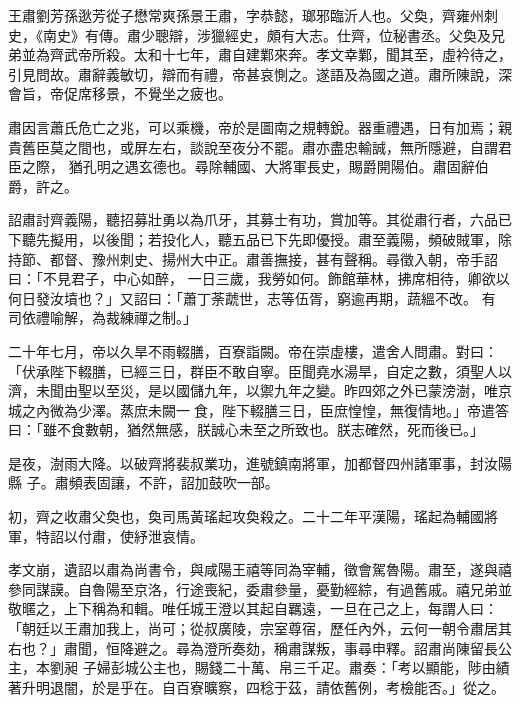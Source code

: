 
\begin{pinyinscope}

 王肅劉芳孫逖芳從子懋常爽孫景王肅，字恭懿，瑯邪臨沂人也。父奐，齊雍州刺史，《南史》有傳。肅少聰辯，涉獵經史，頗有大志。仕齊，位秘書丞。父奐及兄弟並為齊武帝所殺。太和十七年，肅自建鄴來奔。孝文幸鄴，聞其至，虛衿待之，引見問故。肅辭義敏切，辯而有禮，帝甚哀惻之。遂語及為國之道。肅所陳說，深會旨，帝促席移景，不覺坐之疲也。



 肅因言蕭氏危亡之兆，可以乘機，帝於是圖南之規轉銳。器重禮遇，日有加焉；親貴舊臣莫之間也，或屏左右，談說至夜分不罷。肅亦盡忠輸誠，無所隱避，自謂君臣之際，
 猶孔明之遇玄德也。尋除輔國、大將軍長史，賜爵開陽伯。肅固辭伯爵，許之。



 詔肅討齊義陽，聽招募壯勇以為爪牙，其募士有功，賞加等。其從肅行者，六品已下聽先擬用，以後聞；若投化人，聽五品已下先即優授。肅至義陽，頻破賊軍，除持節、都督、豫州刺史、揚州大中正。肅善撫接，甚有聲稱。尋徵入朝，帝手詔曰：「不見君子，中心如醉，
 一日三歲，我勞如何。飾館華林，拂席相待，卿欲以何日發汝墳也？」又詔曰：「蕭丁荼虣世，志等伍胥，窮逾再期，蔬縕不改。
 有
 司依禮喻解，為裁練禪之制。」



 二十年七月，帝以久旱不雨輟膳，百寮詣闕。帝在崇虛樓，遣舍人問肅。對曰：「伏承陛下輟膳，已經三日，群臣不敢自寧。臣聞堯水湯旱，自定之數，須聖人以濟，未聞由聖以至災，是以國儲九年，以禦九年之變。昨四郊之外已蒙滂澍，唯京城之內微為少澤。蒸庶未闕一食，陛下輟膳三日，臣庶惶惶，無復情地。」帝遣答曰：「雖不食數朝，猶然無感，朕誠心未至之所致也。朕志確然，死而後已。」



 是夜，澍雨大降。以破齊將裴叔業功，進號鎮南將軍，加都督四州諸軍事，封汝陽縣
 子。肅頻表固讓，不許，詔加鼓吹一部。



 初，齊之收肅父奐也，奐司馬黃瑤起攻奐殺之。二十二年平漢陽，瑤起為輔國將軍，特詔以付肅，使紓泄哀情。



 孝文崩，遺詔以肅為尚書令，與咸陽王禧等同為宰輔，徵會駕魯陽。肅至，遂與禧參同謀謨。自魯陽至京洛，行途喪紀，委肅參量，憂勤經綜，有過舊戚。禧兄弟並敬暱之，上下稱為和輯。唯任城王澄以其起自羈遠，一旦在己之上，每謂人曰：「朝廷以王肅加我上，尚可；從叔廣陵，宗室尊宿，歷任內外，云何一朝令肅居其右也？」肅聞，恒降避之。尋為澄所奏劾，稱肅謀叛，事尋申釋。詔肅尚陳留長公主，本劉昶
 子婦彭城公主也，賜錢二十萬、帛三千疋。肅奏：「考以顯能，陟由績著升明退闇，於是乎在。自百寮曠察，四稔于茲，請依舊例，考檢能否。」從之。




\end{pinyinscope}
